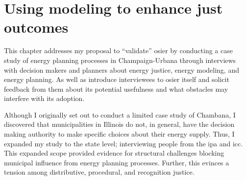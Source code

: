 






\chapter{Using modeling to enhance just outcomes}
\label{chapter:communities}
\iffalse


This chapter addresses my proposal to ``validate'' \ac{osier} by conducting a
case study of energy planning processes in Champaign-Urbana through interviews
with decision makers and planners about energy justice, energy modeling, and
energy planning. As well as introduce interviewees to \ac{osier} itself and
solicit feedback from them about its potential usefulness and what obstacles may
interfere with its adoption. 

Although I originally set out to conduct a limited case study of Chambana, I
discovered that municipalities in Illinois do not, in general, have the decision
making authority to make specific choices about their energy supply.
Thus, I expanded my study to the state level; interviewing people from the
\ac{ipa} and \ac{icc}. This expanded scope provided evidence for structural
challenges blocking municipal influence from energy planning processes. Further,
this evinces a tension among distributive, procedural, and recognition justice.

